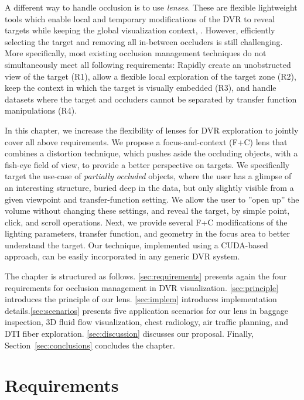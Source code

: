 A different way to handle occlusion is to use \emph{lenses}. These are flexible lightweight tools which enable local and temporary modifications of the DVR to reveal targets while keeping the global visualization context, \cite{595268,CGF:CGF12871,6327262}. However, efficiently selecting the target and  removing all in-between occluders is still challenging. More specifically, most existing occlusion management techniques do not simultaneously meet all following requirements: Rapidly create an unobstructed view of the target (R1), allow a flexible local exploration of the target zone (R2), keep the context in which the target is visually embedded (R3), and handle datasets where the target and occluders cannot 
be separated by transfer function manipulations (R4).

In this chapter, we increase the flexibility of lenses for DVR exploration to jointly cover all above requirements. We propose a focus-and-context (F+C) lens that combines a distortion technique, which pushes aside the occluding objects, with a fish-eye field of view, to provide a better perspective on targets. We specifically target the use-case of \emph{partially occluded} objects, where the user has a glimpse of an interesting structure, buried deep in the data, but only slightly visible from a given viewpoint and transfer-function setting. We allow the user to ''open up'' the volume without changing these settings, and reveal the target, by simple point, click, and scroll operations. Next, we provide several F+C modifications of the lighting parameters, transfer function, and geometry in the focus area to better understand the target. Our technique, implemented using a CUDA-based approach, can be easily incorporated in any generic DVR system.

The chapter is structured as follows. \autoref{sec:requirements} presents again the four requirements for occlusion management in DVR visualization. \autoref{sec:principle} introduces the principle of our lens. \autoref{sec:implem} introduces implementation details.\autoref{sec:scenarios} presents five application scenarios for our lens in baggage inspection, 3D fluid flow visualization, chest radiology, air traffic planning, and DTI fiber exploration. \autoref{sec:discussion} discusses our proposal. Finally, Section~\autoref{sec:conclusions} concludes the chapter.

\section{Requirements}
\label{sec:requirements}

